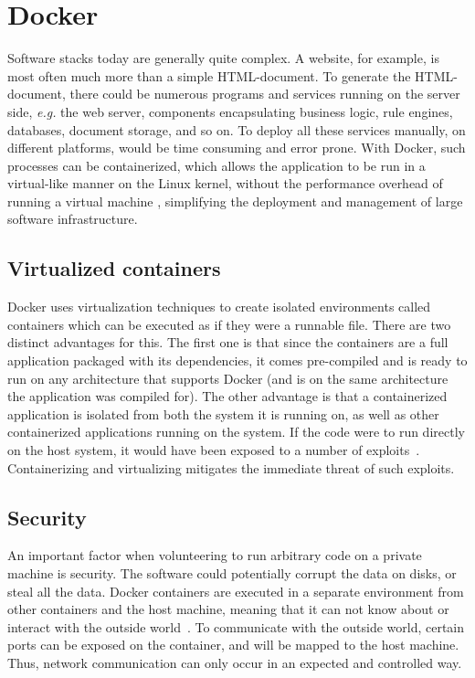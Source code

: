 \section{Docker}
Software stacks today are generally quite complex. A website, for example, is most often much more than a simple HTML-document. To generate the HTML-document, there could be numerous programs and services running on the server side, \textit{e.g.} the web server, components encapsulating business logic, rule engines, databases, document storage, and so on. To deploy all these services manually, on different platforms, would be time consuming and error prone. With Docker, such processes can be containerized, which allows the application to be run in a virtual-like manner on the Linux kernel, without the performance overhead of running a virtual machine \cite{docker-about}, simplifying the deployment and management of large software infrastructure.

\subsection{Virtualized containers}
Docker uses virtualization techniques to create isolated environments called containers which can be executed as if they were a runnable file. There are two distinct advantages for this. The first one is that since the containers are a full application packaged with its dependencies, it comes pre-compiled and is ready to run on any architecture that supports Docker (and is on the same architecture the application was compiled for). The other advantage is that a containerized application is isolated from both the system it is running on, as well as other containerized applications running on the system. If the code were to run directly on the host system, it would have been exposed to a number of exploits~\cite{korpela:2012}. Containerizing and virtualizing mitigates the immediate threat of such exploits.

\subsection{Security}
An important factor when volunteering to run arbitrary code on a private machine is security. The software could potentially corrupt the data on disks, or steal all the data. 
Docker containers are executed in a separate environment from other containers and the host machine, meaning that it can not know about or interact with the outside world~\cite{docker-security}. To communicate with the outside world, certain ports can be exposed on the container, and will be mapped to the host machine. Thus, network communication can only occur in an expected and controlled way. 

